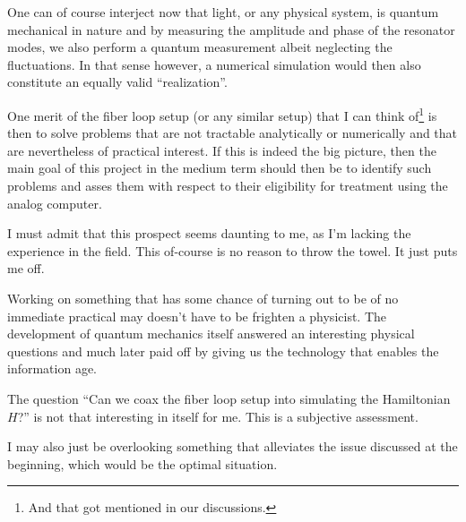 \documentclass[fontsize=10pt,paper=a4,open=any,
twoside=no,toc=listof,toc=bibliography,headings=optiontohead,
captions=nooneline,captions=tableabove,english,DIV=15,numbers=noenddot,final,parskip=half-,
headinclude=true,footinclude=false,BCOR=0mm]{scrartcl}
\begin{document}
One can of course interject now that light, or any physical system, is
quantum mechanical in nature and by measuring the amplitude and phase
of the resonator modes, we also perform a quantum measurement albeit
neglecting the fluctuations. In that sense however, a numerical simulation
would then also constitute an equally valid ``realization''.

One merit of the fiber loop setup (or any similar setup) that I can
think of\footnote{And that got mentioned in our discussions.} is then
to solve problems that are not tractable analytically or numerically
and that are nevertheless of practical interest. If this is indeed the
big picture, then the main goal of this project in the medium term
should then be to identify such problems and asses them with respect
to their eligibility for treatment using the analog computer.

I must admit that this prospect seems daunting to me, as I'm lacking
the experience in the field. This of-course is no reason to throw the
towel. It just puts me off.

Working on something that has some chance of turning out to be of no
immediate practical may doesn't have to be frighten a physicist. The
development of quantum mechanics itself answered an interesting
physical questions and much later paid off by giving us the technology
that enables the information age.

The question ``Can we coax the fiber loop setup into simulating the
Hamiltonian \(H\)?''  is not that interesting in itself for me. This
is a subjective assessment.

I may also just be overlooking something that alleviates the issue
discussed at the beginning, which would be the optimal situation.

\printbibliography{}
\end{document}
